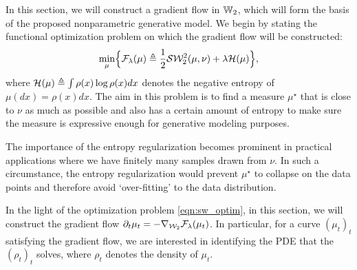 
In this section, we will construct a gradient flow in $\mathbb{W}_2$, which will form the basis of the proposed nonparametric generative model. We begin by stating the functional optimization problem on which the gradient flow will be constructed:
\begin{align}
\min_\mu \Bigl\{ {\cal F}_\lambda(\mu) \triangleq  \frac1{2} {\cal S}{\cal W}_2^2(\mu, \nu) + \lambda {\cal H}(\mu) \Bigr\}, \label{eqn:sw_optim}
\end{align} 
where ${\cal H}(\mu) \triangleq \int \rho(x) \log \rho(x) dx $ denotes the negative entropy of $\mu(dx) = \rho(x)dx$. The aim in this problem is to find a measure $\mu^\star$ that is close to $\nu$ as much as possible and also has a certain amount of entropy to make sure the measure is expressive enough for generative modeling purposes. 

The importance of the entropy regularization becomes prominent in practical applications where we have finitely many samples drawn from $\nu$. In such a circumstance, the entropy regularization would prevent $\mu^\star$ to collapse on the data points and therefore avoid `over-fitting' to the data distribution. 


In the light of the optimization problem \eqref{eqn:sw_optim}, in this section, we will construct the gradient flow $\partial_t \mu_t = - \nabla_{{\cal W}_2} {\cal F}_\lambda(\mu_t)$. In particular, for a curve $(\mu_t)_t$ satisfying the gradient flow, we are interested in identifying the PDE that the $(\rho_t)_t$ solves, where $\rho_t$ denotes the density of $\mu_t$.

